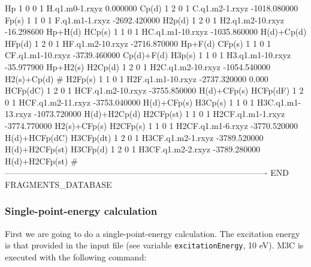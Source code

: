\documentclass[a4paper,12pt]{article}
\begin{document}
\begin{bifile}[caption=\footnotesize M3C input file to describe the fragmentation of CH$_3$F$^+$ molecule (CH3F+.m3c)]
		      Hp     1  0  0    1         H.q1.m0-1.rxyz            0.000000
		    Cp(d)    1  2  0    1         C.q1.m2-1.rxyz        -1018.080000
		    Fp(s)    1  1  0    1         F.q1.m1-1.rxyz        -2692.420000
		   H2p(d)    1  2  0    1       H2.q1.m2-10.rxyz          -16.298600             Hp+H(d)
		   HCp(s)    1  1  0    1       HC.q1.m1-10.rxyz        -1035.860000          H(d)+Cp(d)
		   HFp(d)    1  2  0    1       HF.q1.m2-10.rxyz        -2716.870000             Hp+F(d)
		   CFp(s)    1  1  0    1       CF.q1.m1-10.rxyz        -3739.460000          Cp(d)+F(d)
		   H3p(s)    1  1  0    1       H3.q1.m1-10.rxyz          -35.977900            Hp+H2(s)
		  H2Cp(d)    1  2  0    1      H2C.q1.m2-10.rxyz        -1054.540000         H2(s)+Cp(d)
#		  H2Fp(s)    1  1  0    1      H2F.q1.m1-10.rxyz        -2737.320000               0.000
		 HCFp(dC)    1  2  0    1      HCF.q1.m2-10.rxyz        -3755.850000         H(d)+CFp(s)
		 HCFp(dF)    1  2  0    1      HCF.q1.m2-11.rxyz        -3753.040000         H(d)+CFp(s)
		  H3Cp(s)    1  1  0    1      H3C.q1.m1-13.rxyz        -1073.720000        H(d)+H2Cp(d)
		H2CFp(st)    1  1  0    1      H2CF.q1.m1-1.rxyz        -3774.770000        H2(s)+CFp(s)
		 H2CFp(s)    1  1  0    1      H2CF.q1.m1-6.rxyz        -3770.520000       H(d)+HCFp(dC)
		H3CFp(dt)    1  2  0    1      H3CF.q1.m2-1.rxyz        -3789.520000      H(d)+H2CFp(st)
		 H3CFp(d)    1  2  0    1      H3CF.q1.m2-2.rxyz        -3789.280000      H(d)+H2CFp(st)
	#----------------------------------------------------------------------------------------------
END FRAGMENTS_DATABASE
\end{bifile}

\subsubsection{Single-point-energy calculation}

First we are going to do a single-point-energy calculation. The excitation energy is that provided in the input file (see variable 
\texttt{excitationEnergy}, 10 eV). M3C is executed with the following command:
\end{document}
